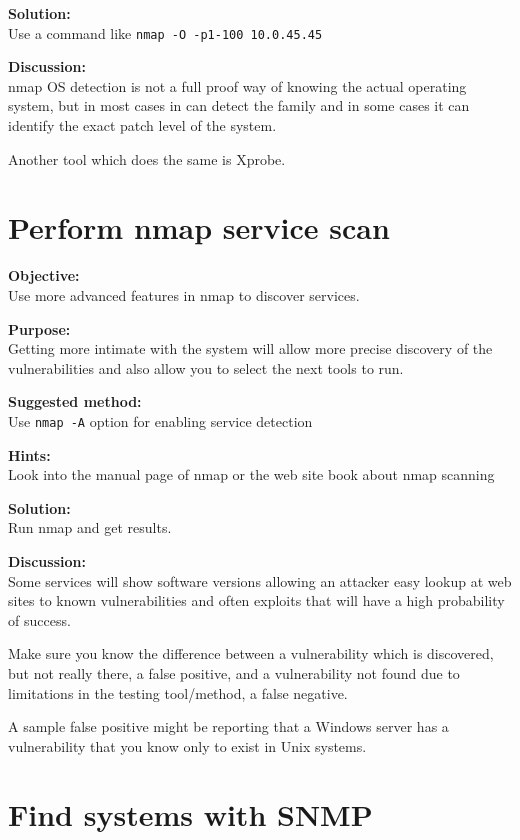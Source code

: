 \documentclass[a4paper,11pt,notitlepage]{report}
\begin{document}
{\bf Solution:}\\
Use a command like \verb+nmap -O -p1-100 10.0.45.45+


{\bf Discussion:}\\
nmap OS detection is not a full proof way of knowing the actual operating system, but in most cases in can detect the family and in some cases it can identify the exact patch level of the system.

Another tool which does the same is Xprobe.

\chapter{Perform nmap service scan}
\label{ex:nmap-service}

{\bf Objective:} \\
Use more advanced features in nmap to discover services.

{\bf Purpose:}\\
Getting more intimate with the system will allow more precise discovery of the vulnerabilities and also allow you to select the next tools to run.

{\bf Suggested method:}\\
Use \verb+nmap -A+ option for enabling service detection

{\bf Hints:} \\
Look into the manual page of nmap or the web site book about nmap scanning

{\bf Solution:}\\
Run nmap and get results.

{\bf Discussion:}\\

Some services will show software versions allowing an attacker easy lookup at web sites to known vulnerabilities and often exploits that will have a high probability of success.

Make sure you know the difference between a vulnerability which is discovered, but not really there, a false positive, and a vulnerability not found due to limitations in the testing tool/method, a false negative.

A sample false positive might be reporting that a Windows server has a vulnerability that you know only to exist in Unix systems.


\chapter{Find systems with SNMP}
\label{ex:find-snmp}
\end{document}
